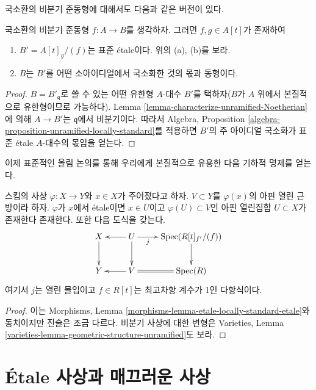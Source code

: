 \noindent
국소환의 비분기 준동형에 대해서도 다음과 같은 버전이 있다.

\begin{theorem}
\label{theorem-structure-unramified}
국소환의 비분기 준동형 $f : A \to B$를 생각하자.
그러면 $f, g \in A[t]$가 존재하여
\begin{enumerate}
\item $B' = A[t]_g/(f)$는 표준 \'etale이다. 위의 (a), (b)를 보라.
\item $B$는 $B'$를 어떤 소아이디얼에서 국소화한 것의 몫과 동형이다.
\end{enumerate}
\end{theorem}

\begin{proof}
$B = B'_{\mathfrak q}$로 쓸 수 있는 어떤 유한형 $A$-대수 $B'$를
택하자($B$가 $A$ 위에서 본질적으로 유한형이므로 가능하다).
Lemma \ref{lemma-characterize-unramified-Noetherian}에 의해
$A \to B'$는 $\mathfrak q$에서 비분기이다.
따라서 Algebra, Proposition
\ref{algebra-proposition-unramified-locally-standard}를 적용하면
$B'$의 주 아이디얼 국소화가 표준 \'etale $A$-대수의 몫임을 얻는다.
\end{proof}

\noindent
이제 표준적인 올림 논의를 통해 우리에게 본질적으로 유용한
다음 기하적 명제를 얻는다.

\begin{theorem}
\label{theorem-geometric-structure}
스킴의 사상 $\varphi : X \to Y$와 $x \in X$가 주어졌다고 하자.
$V \subset Y$를 $\varphi(x)$의 아핀 열린 근방이라 하자.
$\varphi$가 $x$에서 \'etale이면 $x \in U$이고
$\varphi(U) \subset V$인 아핀 열린집합 $U \subset X$가
존재한다 존재한다. 또한 다음 도식을 갖는다.
$$
\xymatrix{
X \ar[d] & U \ar[l] \ar[d] \ar[r]_-j & \Spec(R[t]_{f'}/(f)) \ar[d] \\
Y & V \ar[l] \ar@{=}[r] & \Spec(R)
}
$$
여기서 $j$는 열린 몰입이고 $f \in R[t]$는 최고차항 계수가
1인 다항식이다.
\end{theorem}

\begin{proof}
이는 Morphisms, Lemma
\ref{morphisms-lemma-etale-locally-standard-etale}와 동치이지만
진술은 조금 다르다.
비분기 사상에 대한 변형은 Varieties, Lemma
\ref{varieties-lemma-geometric-structure-unramified}도 보라.
\end{proof}



\section{\'Etale 사상과 매끄러운 사상}
\label{section-etale-smooth}


